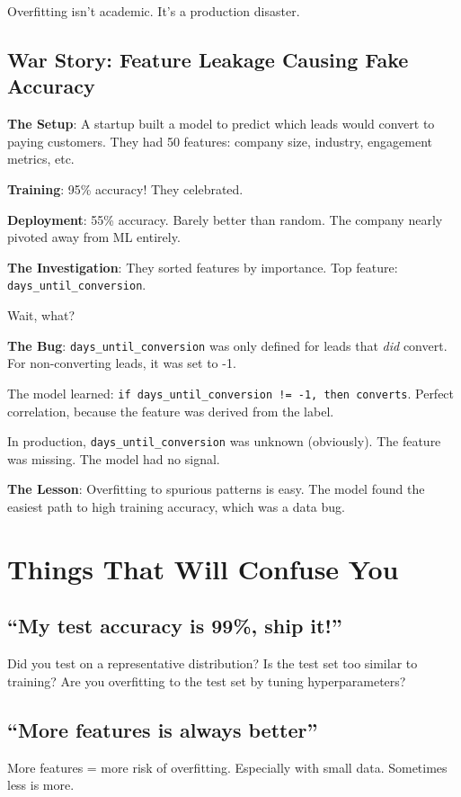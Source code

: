 Overfitting isn't academic. It's a production disaster.

\subsection{War Story: Feature Leakage Causing Fake Accuracy}

\textbf{The Setup}: A startup built a model to predict which leads would convert to paying customers. They had 50 features: company size, industry, engagement metrics, etc.

\textbf{Training}: 95\% accuracy! They celebrated.

\textbf{Deployment}: 55\% accuracy. Barely better than random. The company nearly pivoted away from ML entirely.

\textbf{The Investigation}: They sorted features by importance. Top feature: \texttt{days\_until\_conversion}.

Wait, what?

\textbf{The Bug}: \texttt{days\_until\_conversion} was only defined for leads that \textit{did} convert. For non-converting leads, it was set to -1.

The model learned: \texttt{if days\_until\_conversion != -1, then converts}. Perfect correlation, because the feature was derived from the label.

In production, \texttt{days\_until\_conversion} was unknown (obviously). The feature was missing. The model had no signal.

\textbf{The Lesson}: Overfitting to spurious patterns is easy. The model found the easiest path to high training accuracy, which was a data bug.

\section{Things That Will Confuse You}

\subsection{``My test accuracy is 99\%, ship it!''}
Did you test on a representative distribution? Is the test set too similar to training? Are you overfitting to the test set by tuning hyperparameters?

\subsection{``More features is always better''}
More features = more risk of overfitting. Especially with small data. Sometimes less is more.

